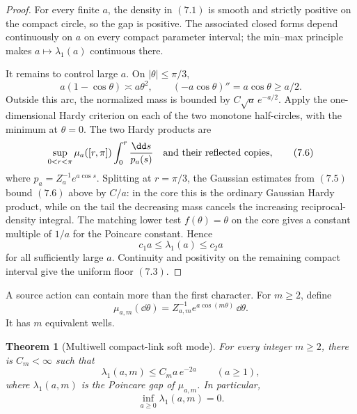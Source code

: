 \documentclass[11pt]{article}
\newtheorem{theorem}{Theorem}[section]
\theoremstyle{remark}
\begin{document}
\begin{proof}
For every finite \(a\), the density in \((7.1)\) is smooth and
strictly positive on the compact circle, so the gap is positive.
The associated closed forms depend continuously on \(a\) on every
compact parameter interval; the min--max principle makes
\(a\mapsto\lambda_1(a)\) continuous there.

It remains to control large \(a\).  On \(|\theta|\le\pi/3\),
\[
 a(1-\cos\theta)\asymp a\theta^2,\qquad
 ( -a\cos\theta)''=a\cos\theta\ge a/2.                       \tag{7.5}
\]
Outside this arc, the normalized mass is bounded by
\(C\sqrt a\,e^{-a/2}\).  Apply the one-dimensional Hardy
criterion on each of the two monotone half-circles, with the
minimum at \(\theta=0\).  The two Hardy products are
\[
 \sup_{0<r<\pi}
 \mu_a([r,\pi])
 \int_0^r\frac{\dd s}{p_a(s)}
 \quad\hbox{and their reflected copies},                    \tag{7.6}
\]
where \(p_a=Z_a^{-1}e^{a\cos s}\).  Splitting at
\(r=\pi/3\), the Gaussian estimates from \((7.5)\) bound
\((7.6)\) above by \(C/a\): in the core this is the ordinary
Gaussian Hardy product, while on the tail the decreasing mass
cancels the increasing reciprocal-density integral.  The matching
lower test \(f(\theta)=\theta\) on the core gives a constant
multiple of \(1/a\) for the Poincare constant.  Hence
\[
 c_1a\le\lambda_1(a)\le c_2a
\]
for all sufficiently large \(a\).  Continuity and positivity on
the remaining compact interval give the uniform floor
\((7.3)\).
\end{proof}

A source action can contain more than the first character.  For
\(m\ge2\), define
\[
 \mu_{a,m}(\dd\theta)
 =Z_{a,m}^{-1}e^{a\cos(m\theta)}\,\dd\theta.                  \tag{7.7}
\]
It has \(m\) equivalent wells.

\begin{theorem}[Multiwell compact-link soft mode]
\label{thm:v15v7-multiwell}
For every integer \(m\ge2\), there is \(C_m<\infty\) such that
\[
 \boxed{\lambda_1(a,m)
 \le C_m a\,e^{-2a}}
 \qquad(a\ge1),                                              \tag{7.8}
\]
where \(\lambda_1(a,m)\) is the Poincare gap of \(\mu_{a,m}\).
In particular,
\[
 \inf_{a\ge0}\lambda_1(a,m)=0.                               \tag{7.9}
\]
\end{theorem}
\end{document}
